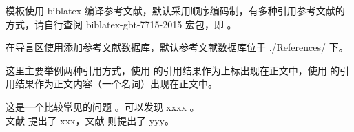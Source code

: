 模板使用 biblatex 编译参考文献，默认采用顺序编码制，有多种引用参考文献的方式，请自行查阅 biblatex-gbt-7715-2015 宏包，即 。

在导言区使用\clist{}添加参考文献数据库，默认参考文献数据库位于 ./References/ 下。

这里主要举例两种引用方式，使用  的引用结果作为上标出现在正文中，使用  的引用结果作为正文内容（一个名词）出现在正文中。

\begin{texcode}[]{}
  这是一个比较常见的问题 \cite{barella_situ_2021}。可以发现 xxxx \cite{atta_enhanced_2021}。\\

  文献\parencite{张燕2013电气自动化在电气工程中的应用探讨} 提出了 xxx，文献 \parencite{黄雪芳2012探讨电气工程中自动化技术的应用} 则提出了 yyy。
\end{texcode}
